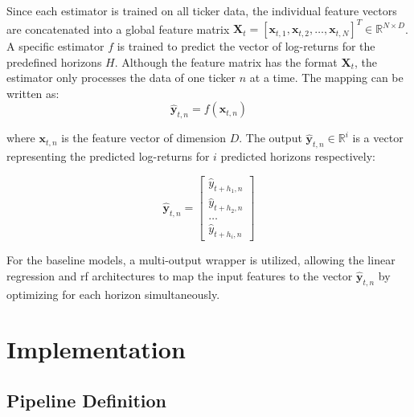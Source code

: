 \documentclass[12pt,twoside=false,a4paper,parskip]{scrbook}
\begin{document}
Since each estimator is trained on all ticker data, the individual feature vectors are concatenated into a global feature matrix $\mathbf{X}_t = [\mathbf{x}_{t,1}, \mathbf{x}_{t,2}, \dots, \mathbf{x}_{t,N}]^T \in \mathbb{R}^{N \times D}$. A specific estimator $f$ is trained to predict the vector of log-returns for the predefined horizons $H$. Although the feature matrix has the format $\mathbf{X}_t$, the estimator only processes the data of one ticker $n$ at a time. The mapping can be written as:
\begin{equation}
   \hat{\mathbf{y}}_{t, n} = f(\mathbf{x}_{t,n})
\end{equation}

where $\mathbf{x}_{t,n}$ is the feature vector of dimension $D$. The output $\hat{\mathbf{y}}_{t, n} \in \mathbb{R}^i$ is a vector representing the predicted log-returns for $i$ predicted horizons respectively:

\begin{equation}
    \hat{\mathbf{y}}_{t, n} = \begin{bmatrix} \hat{y}_{t+h_1, n} \\ \hat{y}_{t+h_2, n} \\ \dots \\ \hat{y}_{t+h_i, n} \end{bmatrix}
\end{equation}


For the baseline models, a multi-output wrapper is utilized, allowing the linear regression and \gls{rf} architectures to map the input features to the vector $\hat{\mathbf{y}}_{t, n}$ by optimizing for each horizon simultaneously.



\chapter{Implementation}
\label{ch:implementation}

\section{Pipeline Definition}
\end{document}

